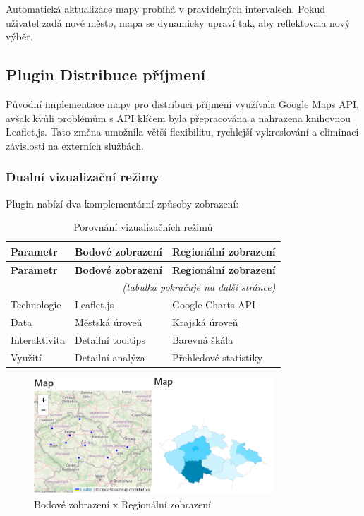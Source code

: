 \documentclass[czech, ba, kiv, he]{fasthesis}
\begin{document}
Automatická aktualizace mapy probíhá v pravidelných intervalech. Pokud uživatel zadá nové město, mapa se dynamicky upraví tak, aby reflektovala nový výběr.

\subsection{Plugin Distribuce příjmení}
Původní implementace mapy pro distribuci příjmení využívala Google Maps API, avšak kvůli problémům s API klíčem byla přepracována a nahrazena knihovnou Leaflet.js. Tato změna umožnila větší flexibilitu, rychlejší vykreslování a eliminaci závislosti na externích službách.

\subsubsection*{Dualní vizualizační režimy}
Plugin nabízí dva komplementární způsoby zobrazení:

\begin{center}
\begin{longtable}{|l|l|l|}
\caption{Porovnání vizualizačních režimů}
\label{tab:viz_modes}\\
\hline
\textbf{Parametr} & \textbf{Bodové zobrazení} & \textbf{Regionální zobrazení} \\ \hline
\endfirsthead
\hline
\textbf{Parametr} & \textbf{Bodové zobrazení} & \textbf{Regionální zobrazení} \\ \hline
\endhead
\hline
\multicolumn{3}{r}{\textit{(tabulka pokračuje na další stránce)}}\\
\endfoot
\hline
\endlastfoot
Technologie & Leaflet.js & Google Charts API \\ \hline
Data & Městská úroveň & Krajská úroveň \\ \hline
Interaktivita & Detailní tooltips & Barevná škála \\ \hline
Využití & Detailní analýza & Přehledové statistiky \\ \hline
\end{longtable}
\end{center}


\begin{figure}[h]  
    \centering  
    \includegraphics[width=0.8\textwidth]{city_region.png}  
    \caption{Bodové zobrazení x Regionální zobrazení}  
\end{figure}
\end{document}
